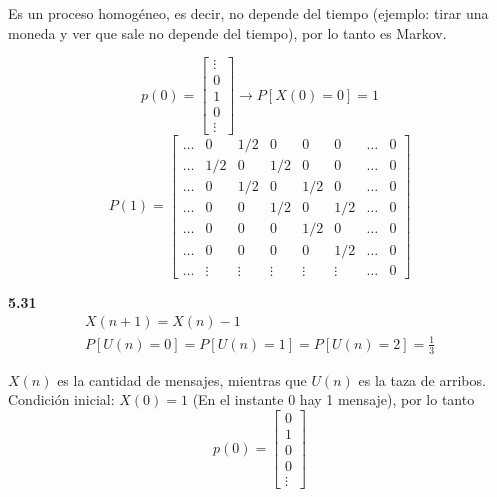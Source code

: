 Es un proceso homogéneo, es decir, no depende del tiempo (ejemplo: tirar una moneda y ver que sale no depende del tiempo), por lo tanto es Markov.

\begin{equation*}
	p(0) = \left[ \begin{array}{c} \vdots \\ 0 \\ 1 \\ 0 \\ \vdots \end{array} \right] \rightarrow P\left[ X(0) = 0 \right] = 1
\end{equation*}
\begin{equation*}
	P(1) = \begin{bmatrix}
				\hdots & 0 & 1/2 & 0 & 0 & 0 & \hdots & 0 \\
				\hdots & 1/2 & 0 & 1/2 & 0 & 0 & \hdots & 0 \\
				\hdots & 0 & 1/2 & 0 & 1/2 & 0 & \hdots & 0 \\
				\hdots & 0 & 0 & 1/2 & 0 & 1/2 & \hdots & 0 \\
				\hdots & 0 & 0 & 0 & 1/2 & 0 & \hdots & 0 \\
				\hdots & 0 & 0 & 0 & 0 & 1/2 & \hdots & 0 \\
				\hdots & \vdots & \vdots & \vdots & \vdots & \vdots & \hdots & 0 
		   \end{bmatrix}
\end{equation*}

\vspace{1cm}

\textbf{5.31}
\begin{equation*}
\begin{gathered}
	X(n+1) = X(n) - 1  \\
	P[U(n) = 0] = P[U(n) = 1] = P[U(n) = 2] = \frac{1}{3}
\end{gathered}
\end{equation*}

$X(n)$ es la cantidad de mensajes, mientras que $U(n)$ es la taza de arribos. Condición inicial: $X(0) = 1$ (En el instante 0 hay 1 mensaje), por lo tanto
\begin{equation*}
	p(0) = \left[ \begin{array}{c} 0 \\ 1 \\ 0 \\ 0 \\ \vdots \end{array} \right]
\end{equation*}

